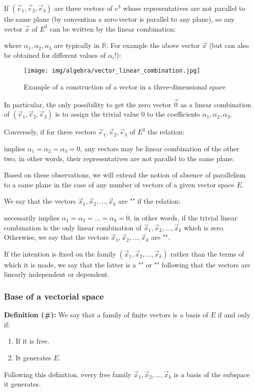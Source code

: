 	If $(\vec{e}_1,\vec{e}_2,\vec{e}_3)$ are three vectors of $e^3$ whose representatives are not parallel to the same plane (by convention a zero-vector is parallel to any plane), so any vector $\vec{x}$ of $E^3$ can be written by the linear combination:
	
	where $\alpha_1,\alpha_2,\alpha_3$ are typically in $\mathbb{R}$.
	For example the above vector $\vec{x}$ (but can also be obtained for different values of $\alpha_i$!):
	\begin{figure}[H]
		\centering
		\texttt{[image: img/algebra/vector\_linear\_combination.jpg]}
		\caption{Example of a construction of a vector in a three-dimensional space}
	\end{figure}
	In particular, the only possibility to get the zero vector $\vec{0}$ as a linear combination of $(\vec{e}_1,\vec{e}_2,\vec{e}_3)$ is to assign the trivial value $0$ to the coefficients $\alpha_1,\alpha_2,\alpha_3$.

	Conversely, if for three vectors  $\vec{e}_1,\vec{e}_2,\vec{e}_3$ of $E^3$ the relation:
		
	implies $\alpha_1=\alpha_2=\alpha_3=0$, any vectors may be linear combination of the other two, in other words, their representatives are not parallel to the same plane.
	
	Based on these observations, we will extend the notion of absence of parallelism to a same plane in the case of any number of vectors of a given vector space $E$.
	
	We say that the vectors $\vec{x}_1,\vec{x}_2,...,\vec{x}_k$ are "" if the relation:
	
	necessarily implies  $\alpha_1=\alpha_2=...=\alpha_k=0$, in other words, if the trivial linear combination is the only linear combination of $\vec{x}_1,\vec{x}_2,...,\vec{x}_k$ which is zero. Otherwise, we say that the vectors $\vec{x}_1,\vec{x}_2,...,\vec{x}_k$ are "".
	
	If the intention is fixed on the family $(\vec{x}_1,\vec{x}_2,...,\vec{x}_k)$ rather than the terms of which it is made, we say that the latter is a "" or "" following that the vectors are linearly independent or dependent.
	
	\subsubsection{Base of a vectorial space}
	\textbf{Definition (\#\mydef):} We say that a family of finite vectors is a basis of $E$\label{vector basis} if and only if:
	\begin{enumerate}
		\item If it is free.
		
		\item It generates $E$.
	\end{enumerate}
	Following this definition, every free family $\vec{x}_1,\vec{x}_2,...,\vec{x}_k$ is a basis of the subspace it generates.
	

